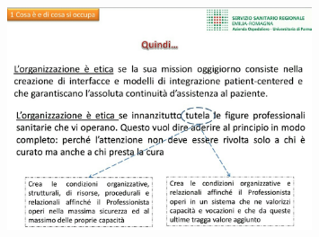  \begin{figure}[!ht]
\centering
	\includegraphics[width=0.8\textwidth]{32/image7.jpeg}
	\end{figure}

